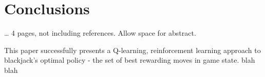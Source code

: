 \section{Conclusions}
\dots
4 pages, not including references. Allow space for abstract.

This paper successfully presents a Q-learning, reinforcement learning approach to blackjack's optimal policy - the set of best rewarding moves in game state. blah blah